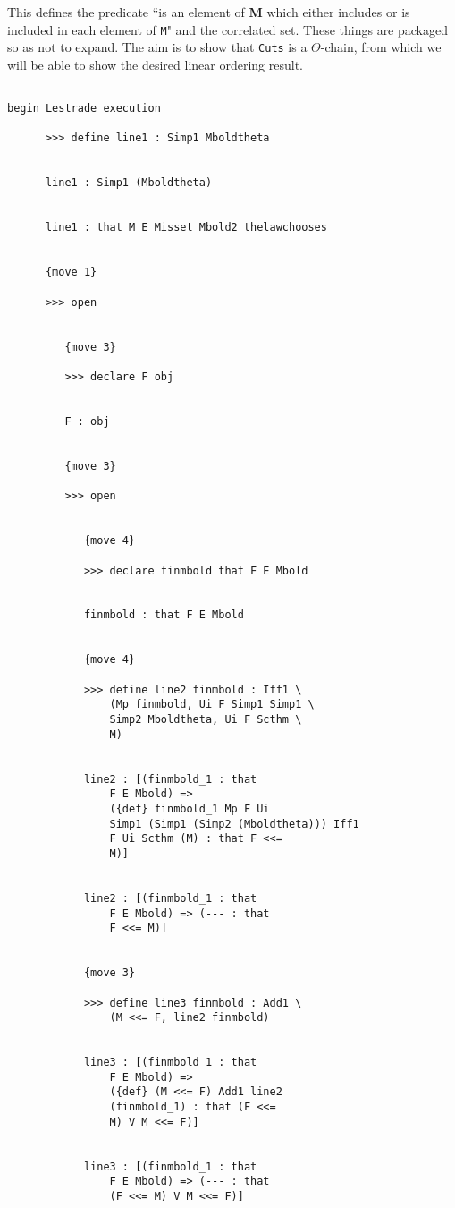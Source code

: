 \documentclass[12pt]{article}
\begin{document}
This defines the predicate ``is an element of {\bf M} which either includes or is included in each element of {\tt M}" and the correlated set.  These things are packaged so as not to expand.
The aim is to show that {\tt Cuts} is a $\Theta$-chain, from which we will be able to show the desired linear ordering result.

\begin{verbatim}

begin Lestrade execution

      >>> define line1 : Simp1 Mboldtheta


      line1 : Simp1 (Mboldtheta)


      line1 : that M E Misset Mbold2 thelawchooses


      {move 1}

      >>> open


         {move 3}

         >>> declare F obj


         F : obj


         {move 3}

         >>> open


            {move 4}

            >>> declare finmbold that F E Mbold


            finmbold : that F E Mbold


            {move 4}

            >>> define line2 finmbold : Iff1 \
                (Mp finmbold, Ui F Simp1 Simp1 \
                Simp2 Mboldtheta, Ui F Scthm \
                M)


            line2 : [(finmbold_1 : that 
                F E Mbold) => 
                ({def} finmbold_1 Mp F Ui 
                Simp1 (Simp1 (Simp2 (Mboldtheta))) Iff1 
                F Ui Scthm (M) : that F <<= 
                M)]


            line2 : [(finmbold_1 : that 
                F E Mbold) => (--- : that 
                F <<= M)]


            {move 3}

            >>> define line3 finmbold : Add1 \
                (M <<= F, line2 finmbold)


            line3 : [(finmbold_1 : that 
                F E Mbold) => 
                ({def} (M <<= F) Add1 line2 
                (finmbold_1) : that (F <<= 
                M) V M <<= F)]


            line3 : [(finmbold_1 : that 
                F E Mbold) => (--- : that 
                (F <<= M) V M <<= F)]



\end{verbatim}
\end{document}
